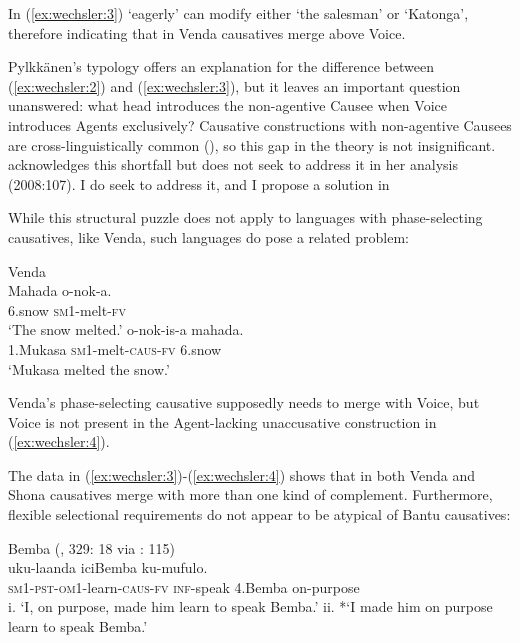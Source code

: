 \documentclass[output=paper,modfonts,nonflat,colorlinks,citecolor=brown]{langsci/langscibook}
\begin{document}
In (\ref{ex:wechsler:3}) ‘eagerly’ can modify either ‘the salesman’ or ‘Katonga’, therefore indicating that in Venda causatives merge above Voice.



Pylkkänen’s typology offers an explanation for the difference between (\ref{ex:wechsler:2}) and (\ref{ex:wechsler:3}), but it leaves an important question unanswered: what head introduces the non-agentive Causee when Voice introduces Agents exclusively? Causative constructions with non-agentive Causees are cross-linguistically common (\citealt{Kulikov2001,Kittilä2013}), so this gap in the theory is not insignificant. \citeauthor{Pylkkänen2008} acknowledges this shortfall but does not seek to address it in her analysis (2008:107). I do seek to address it, and I propose a solution in 



While this structural puzzle does not apply to languages with phase-selecting causatives, like Venda, such languages do pose a related problem:


\ea\label{ex:wechsler:4}
Venda \citet[2]{Pylkkänen2008}\\
\ea
\gll Mahada  {{o-nok-a}}. \\
6.snow  {\textsc{sm1}{}-melt-\textsc{fv} }\\
\glt `The snow melted.'
\ex
{}  {{o-nok-is-a} } {mahada}.\\
 {1.Mukasa}   {\textsc{sm1}{}-melt-\textsc{caus}{}-\textsc{fv} }  6.snow\\
\glt `Mukasa melted the snow.'
\z
\z

Venda’s phase-selecting causative supposedly needs to merge with Voice, but Voice is not present in the Agent-lacking unaccusative construction in (\ref{ex:wechsler:4}).

The data in (\ref{ex:wechsler:3})-(\ref{ex:wechsler:4}) shows that in both Venda and Shona causatives merge with more than one kind of complement. Furthermore, flexible selectional requirements do not appear to be atypical of Bantu causatives:

\newpage
\ea\label{ex:wechsler:5}
{Bemba (\citealt{Givón1969}, 329: 18 via \citealt{Pylkkänen2008}: 115)}\\
 {uku-laanda} {iciBemba} {ku-mufulo}.\\
\textsc{sm}1\textsc{-pst-om1}-learn-\textsc{caus-fv}  \textsc{inf-}speak  4.Bemba  on-purpose\\
\glt i. ‘I, on purpose, made him learn to speak Bemba.’
\glt ii. *‘I made him on purpose learn to speak Bemba.'
\z
\end{document}
